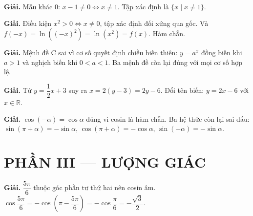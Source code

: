\documentclass[11pt, a4paper]{article}
\begin{document}
\vspace{0.3cm}
\begin{dapan}[7 — Đáp án C]

\textbf{Giải.} Mẫu khác $0$: $x-1\ne0 \iff x\ne1$. Tập xác định là $\{x\mid x\ne1\}$.


\end{dapan}
\vspace{0.3cm}
\begin{dapan}[8 — Đáp án A]

\textbf{Giải.} Điều kiện $x^2>0 \iff x\ne0$, tập xác định đối xứng qua gốc. Và $f(-x)=\ln((-x)^2)=\ln(x^2)=f(x)$. Hàm chẵn.


\end{dapan}
\vspace{0.3cm}
\begin{dapan}[9 — Đáp án C]

\textbf{Giải.} Mệnh đề C sai vì cơ số quyết định chiều biến thiên: $y=a^x$ đồng biến khi $a>1$ và nghịch biến khi $0<a<1$. Ba mệnh đề còn lại đúng với mọi cơ số hợp lệ.


\end{dapan}
\vspace{0.3cm}
\begin{dapan}[10 — Đáp án C]

\textbf{Giải.} Từ $y=\dfrac{1}{2}x+3$ suy ra $x=2(y-3)=2y-6$. Đổi tên biến: $y=2x-6$ với $x\in\mathbb{R}$.


\end{dapan}
\vspace{0.3cm}
\begin{dapan}[11 — Đáp án D]

\textbf{Giải.} $\cos(-\alpha)=\cos\alpha$ đúng vì cosin là hàm chẵn. Ba hệ thức còn lại sai dấu: $\sin(\pi+\alpha)=-\sin\alpha$, $\cos(\pi+\alpha)=-\cos\alpha$, $\sin(-\alpha)=-\sin\alpha$.

\section{PHẦN III — LƯỢNG GIÁC}


\end{dapan}
\vspace{0.3cm}
\begin{dapan}[12 — Đáp án D]

\textbf{Giải.} $\dfrac{5\pi}{6}$ thuộc góc phần tư thứ hai nên cosin âm. $\cos\dfrac{5\pi}{6}=-\cos\left(\pi-\dfrac{5\pi}{6}\right)=-\cos\dfrac{\pi}{6}=-\dfrac{\sqrt{3}}{2}$.


\end{dapan}
\end{document}
